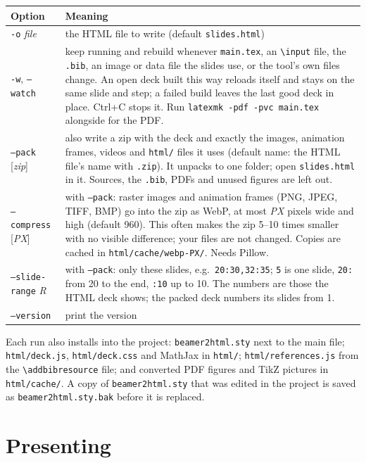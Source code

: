 \documentclass[a4paper,11pt]{article}
\newcommand\cs[1]{\texttt{\textbackslash #1}}
\newcommand\opt[1]{\texttt{#1}}
\newcommand\file[1]{\texttt{#1}}
\begin{document}
\medskip\noindent
\begin{tabularx}{\linewidth}{@{}lL@{}}
\toprule
Option & Meaning \\
\midrule
\opt{-o} \textit{file} & the HTML file to write (default \file{slides.html}) \\
\opt{-w}, \opt{--watch} & keep running and rebuild whenever \file{main.tex},
  an \cs{input} file, the \file{.bib}, an image or data file the slides use,
  or the tool's own files change. An open deck built this way reloads itself
  and stays on the same slide and step; a failed build leaves the last good
  deck in place. Ctrl+C stops it. Run \texttt{latexmk -pdf -pvc main.tex}
  alongside for the PDF. \\
\opt{--pack} [\textit{zip}] & also write a zip with the deck and exactly the
  images, animation frames, videos and \file{html/} files it uses (default
  name: the HTML file's name with \file{.zip}). It unpacks to one folder;
  open \file{slides.html} in it. Sources, the \file{.bib}, PDFs and unused
  figures are left out. \\
\opt{--compress} [\textit{PX}] & with \opt{--pack}: raster images and
  animation frames (PNG, JPEG, TIFF, BMP) go into the zip as WebP, at most
  \textit{PX} pixels wide and high (default 960). This often makes the zip
  5--10 times smaller with no visible difference; your files are not
  changed. Copies are cached in \file{html/cache/webp-PX/}. Needs Pillow. \\
\opt{--slide-range} \textit{R} & with \opt{--pack}: only these slides, e.g.\
  \texttt{20:30,32:35}; \texttt{5} is one slide, \texttt{20:} from 20 to the
  end, \texttt{:10} up to 10. The numbers are those the HTML deck shows; the
  packed deck numbers its slides from 1. \\
\opt{--version} & print the version \\
\bottomrule
\end{tabularx}

\medskip
Each run also installs into the project: \file{beamer2html.sty} next to the
main file; \file{html/deck.js}, \file{html/deck.css} and MathJax in
\file{html/}; \file{html/references.js} from the \cs{addbibresource} file;
and converted PDF figures and TikZ pictures in \file{html/cache/}. A copy of
\file{beamer2html.sty} that was edited in the project is saved as
\file{beamer2html.sty.bak} before it is replaced.

\section{Presenting}
\end{document}
